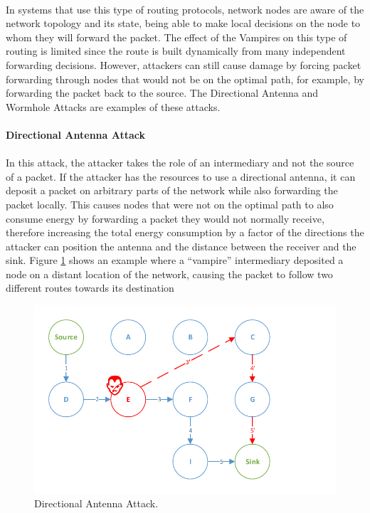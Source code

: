 \paragraph{}
In systems that use this type of routing protocols, network nodes are aware of the network topology and its state, being able to make local decisions on the node to whom they will forward the packet. The effect of the Vampires on this type of routing is limited since the route is built dynamically from many independent forwarding decisions. However, attackers can still cause damage by forcing packet forwarding through nodes that would not be on the optimal path, for example, by forwarding the packet back to the source. The Directional Antenna and Wormhole Attacks are examples of these attacks.

\paragraph{\textbf{Directional Antenna Attack}}
\paragraph{}
In this attack, the attacker takes the role of an intermediary and not the source of a packet. If the attacker has the resources to use a directional antenna, it can deposit a packet on arbitrary parts of the network while also forwarding the packet locally. This causes nodes that were not on the optimal path to also consume energy by forwarding a packet they would not normally receive, therefore increasing the total energy consumption by a factor of the directions the attacker can position the antenna and the distance between the receiver and the sink. Figure \ref{fig:directional_antenna_attack} shows an example where a ``vampire'' intermediary deposited a node on a distant location of the network, causing the packet to follow two different routes towards its destination

\begin{figure}[h]
  \centering
  \includegraphics[width=0.8\linewidth]{figures/Directional_Antenna_Attack.pdf}
  \caption{Directional Antenna Attack.}
  \label{fig:directional_antenna_attack}
\end{figure}

